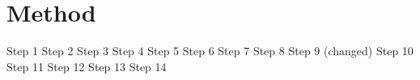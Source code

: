 \documentclass{article}
\begin{document}
\section{Method}
Step 1
Step 2
Step 3
Step 4
Step 5
Step 6
Step 7
Step 8
Step 9 (changed)
Step 10
Step 11
Step 12
Step 13
Step 14
\end{document}

